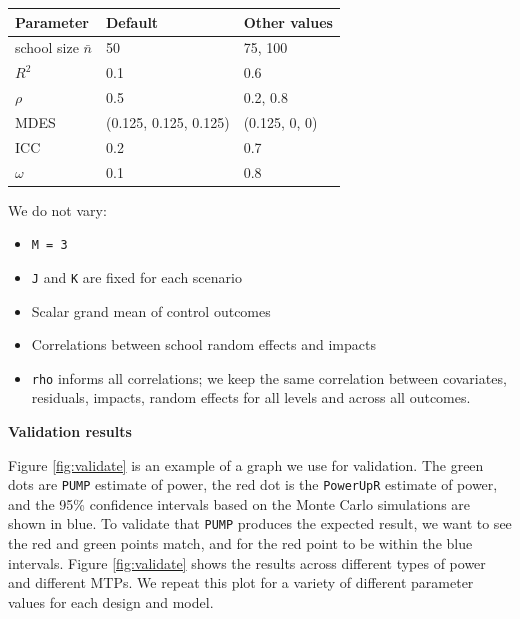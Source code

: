 \documentclass{article}
\providecommand{\tightlist}{%
  \setlength{\itemsep}{0pt}\setlength{\parskip}{0pt}}
\begin{document}
\begin{table}
\centering
\begin{tabular}{l l l}
\toprule
Parameter               & Default                & Other values \\ \midrule
school size $\bar{n}$   & 50                     & 75, 100           \\
$R^2$                   & 0.1                    & 0.6               \\
$\rho$                  & 0.5                    & 0.2, 0.8          \\
MDES                    & (0.125, 0.125, 0.125)  & (0.125, 0, 0)     \\
ICC                     & 0.2                    & 0.7               \\
$\omega$                & 0.1                    & 0.8               \\
\bottomrule
\end{tabular}
\label{tab:val_params}
\end{table}

We do not vary:

\begin{itemize}
\tightlist
\item
  \texttt{M\ =\ 3}
\item
  \texttt{J} and \texttt{K} are fixed for each scenario
\item
  Scalar grand mean of control outcomes
\item
  Correlations between school random effects and impacts
\item
  \texttt{rho} informs all correlations; we keep the same correlation
  between covariates, residuals, impacts, random effects for all levels
  and across all outcomes.
\end{itemize}

\textbf{Validation results}

Figure \ref{fig:validate} is an example of a graph we use for
validation. The green dots are \texttt{PUMP} estimate of power, the red
dot is the \texttt{PowerUpR} estimate of power, and the 95\% confidence
intervals based on the Monte Carlo simulations are shown in blue. To
validate that \texttt{PUMP} produces the expected result, we want to see
the red and green points match, and for the red point to be within the
blue intervals. Figure \ref{fig:validate} shows the results across
different types of power and different MTPs. We repeat this plot for a
variety of different parameter values for each design and model.
\end{document}
